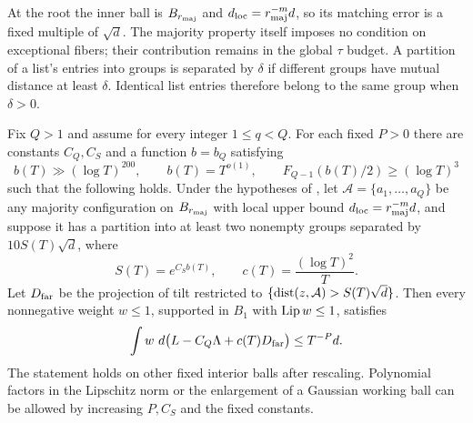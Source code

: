 At the root the inner ball is $B_{r_{\rm maj}}$ and
$d_{\rm loc}=r_{\rm maj}^{-m}d$, so its matching error is a fixed
multiple of $\sqrt d$. The majority property itself imposes no condition
on exceptional fibers; their contribution remains in the global $\tau$
budget. A partition of a list's entries into groups is separated by
$\delta$ if different groups have mutual distance at least $\delta$.
Identical list entries therefore belong to the same group when $\delta>0$.

\begin{proposition}\label{ct:separated}
Fix $Q>1$ and assume  for every integer $1\le q<Q$.
For each fixed $P>0$ there are constants $C_Q,C_S$ and a function
$b=b_Q$ satisfying
\begin{equation}\label{ct:b-choice}
 b(T)\gg(\log T)^{200},\qquad b(T)=T^{o(1)},\qquad
 F_{Q-1}(b(T)/2)\ge(\log T)^3
\end{equation}
such that the following holds.  Under the hypotheses of
, let $\mathcal A=\{a_1,\ldots,a_Q\}$ be any majority
configuration on $B_{r_{\rm maj}}$ with local upper bound
$d_{\rm loc}=r_{\rm maj}^{-m}d$, and suppose it has a partition into at least two
nonempty groups separated by
$10S(T)\sqrt d$, where
\[
 S(T)=e^{C_Sb(T)},\qquad c(T)=\frac{(\log T)^2}{T}.
\]
Let $D_{\rm far}$ be the projection of tilt restricted to
$\{\operatorname{dist}(z,\mathcal A)>S(T)\sqrt d\}$.  Then every nonnegative weight
$w\le1$, supported in $B_1$ with $\operatorname{Lip} w\le1$, satisfies
\begin{equation}\label{ct:separated-estimate}
 \int w\,\mathop{}\!d\bigl(L-C_Q\Lambda+c(T)D_{\rm far}\bigr)
 \le T^{-P}d.
\end{equation}
The statement holds on other fixed interior balls after rescaling.
Polynomial factors in the Lipschitz norm or the enlargement of a
Gaussian working ball can be allowed by increasing $P,C_S$ and the
fixed constants.
\end{proposition}

